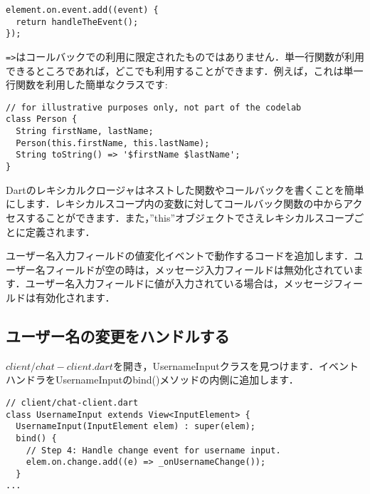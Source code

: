 \begin{verbatim}
element.on.event.add((event) {
  return handleTheEvent();
});
\end{verbatim}

\verb|=>|はコールバックでの利用に限定されたものではありません．単一行関数が利用できるところであれば，どこでも利用することができます．例えば，これは単一行関数を利用した簡単なクラスです:

\begin{verbatim}
// for illustrative purposes only, not part of the codelab
class Person {
  String firstName, lastName;
  Person(this.firstName, this.lastName);
  String toString() => '$firstName $lastName';
}
\end{verbatim}

Dartのレキシカルクロージャはネストした関数やコールバックを書くことを簡単にします．レキシカルスコープ内の変数に対してコールバック関数の中からアクセスすることができます．また，''this''オブジェクトでさえレキシカルスコープごとに定義されます．


ユーザー名入力フィールドの値変化イベントで動作するコードを追加します．ユーザー名フィールドが空の時は，メッセージ入力フィールドは無効化されています．ユーザー名入力フィールドに値が入力されている場合は，メッセージフィールドは有効化されます．

\subsection{ユーザー名の変更をハンドルする}

$ client/chat-client.dart $を開き，UsernameInputクラスを見つけます．イベントハンドラをUsernameInputのbind()メソッドの内側に追加します．

\begin{verbatim}
// client/chat-client.dart
class UsernameInput extends View<InputElement> {
  UsernameInput(InputElement elem) : super(elem);
  bind() {
    // Step 4: Handle change event for username input.
    elem.on.change.add((e) => _onUsernameChange());
  }
...
\end{verbatim}


